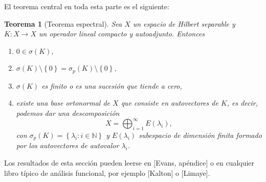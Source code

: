 \documentclass[12pt,a4paper]{article}
\newtheorem{thm}{Teorema}[section]
\theoremstyle{definition} \newtheorem{defn}[thm]{Definición}
\theoremstyle{definition} \newtheorem{ejemplo}[thm]{Ejemplo}
\theoremstyle{definition} \newtheorem{ejercicio}[thm]{Ejercicio}
\theoremstyle{remark} \newtheorem*{obs}{Observación}
\begin{document}
 El teorema central en toda esta parte es el siguiente:
 \begin{thm}[Teorema espectral]
   Sea $X$ un espacio de Hilbert separable y $K:X\rightarrow X$ un operador lineal compacto y autoadjunto. Entonces 
   \begin{enumerate}
     \item $0 \in \sigma(K)$,
     \item $\sigma(K) \setminus \left\{ 0 \right\} = \sigma_p(K) \setminus \left\{ 0 \right\}$,
     \item $\sigma(K)$ es finito o es una sucesión que tiende a cero,
     \item existe una base ortonormal de $X$ que consiste en autovectores de $K$, es decir, podemos dar una descomposición
       \begin{equation*}
	 X=\bigoplus_{i=1}^\infty E(\lambda_i),
       \end{equation*}
       con $\sigma_p(K)=\left\{ \lambda_i: i\in \mathbb{N} \right\}$ y $E(\lambda_i)$ subespacio de dimensión finita formado por los autovectores de autovalor $\lambda_i$.
   \end{enumerate}
 \end{thm}

 Los resultados de esta sección pueden leerse en [Evans, apéndice] o en cualquier libro típico de análisis funcional, por ejemplo [Kalton] o [Limaye].
\end{document}
